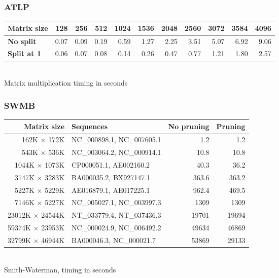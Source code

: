\subsubsection*{ATLP\cite{gpu_atlp}}
\begin{center}\begin{tabular}{lrrrrrrrrrr} \toprule
\bf Matrix size & 128 & 256 & 512 & 1024 & 1536 & 2048 & 2560 & 3072 & 3584 & 4096 \\ \midrule
\bf No split & 0.07 & 0.09 & 0.19 & 0.59 & 1.27 & 2.25 & 3.51 & 5.07 & 6.92 & 9.06 \\
\bf Split at 1 & 0.06 & 0.07 & 0.08 & 0.14 & 0.26 & 0.47 & 0.77 & 1.21 & 1.80 & 2.57 \\ \bottomrule
\end{tabular} \\[4pt] Matrix multiplication timing in seconds \end{center}

\subsubsection*{SWMB\cite{swat_mega}}
\begin{center}\begin{tabular}{rlrr} \toprule
\bf Matrix size & \bf Sequences & \bf No pruning & \bf Pruning \\ \midrule
162K $\times$ 172K		& NC\_000898.1, NC\_007605.1	& 1.2 & 1.2 \\
543K $\times$ 536K		& NC\_003064.2, NC\_000914.1	& 10.8 & 10.8 \\
1044K $\times$ 1073K	& CP000051.1, AE002160.2		& 40.3 & 36.2 \\
3147K $\times$ 3283K	& BA000035.2, BX927147.1		& 363.6 & 363.2 \\ 
5227K $\times$ 5229K	& AE016879.1, AE017225.1		& 962.4 & 469.5 \\
7146K $\times$ 5227K	& NC\_005027.1, NC\_003997.3	& 1309 & 1309 \\
23012K $\times$ 24544K	& NT\_033779.4, NT\_037436.3	& 19701 & 19694 \\
59374K $\times$ 23953K	& NC\_000024.9, NC\_006492.2	& 49634 & 46869 \\
32799K $\times$ 46944K	& BA000046.3, NC\_000021.7		& 53869 & 29133 \\ \bottomrule
\end{tabular} \\[4pt] Smith-Waterman, timing in seconds \end{center}


